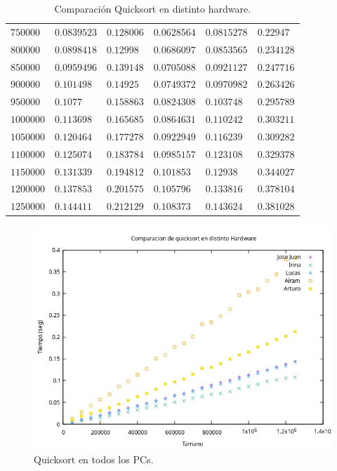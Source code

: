 \documentclass[12pt]{article}
\begin{document}
\begin{table}
\begin{tabular}{|l|l|l|l|l|l|}
            $750000$ & $0.0839523$ & $0.128006$ & $0.0628564$ & $0.0815278$ & $0.22947$ \\
            $800000$ & $0.0898418$ & $0.12998$ & $0.0686097$ & $0.0853565$ & $0.234128$ \\
            $850000$ & $0.0959496$ & $0.139148$ & $0.0705088$ & $0.0921127$ & $0.247716$ \\
            $900000$ & $0.101498$ & $0.14925$ & $0.0749372$ & $0.0970982$ & $0.263426$ \\
            $950000$ & $0.1077$ & $0.158863$ & $0.0824308$ & $0.103748$ & $0.295789$ \\
            $1000000$ & $0.113698$ & $0.165685$ & $0.0864631$ & $0.110242$ & $0.303211$ \\
            $1050000$ & $0.120464$ & $0.177278$ & $0.0922949$ & $0.116239$ & $0.309282$ \\
            $1100000$ & $0.125074$ & $0.183784$ & $0.0985157$ & $0.123108$ & $0.329378$ \\
            $1150000$ & $0.131339$ & $0.194812$ & $0.101853$ & $0.12938$ & $0.344027$ \\
            $1200000$ & $0.137853$ & $0.201575$ & $0.105796$ & $0.133816$ & $0.378104$ \\
            $1250000$ & $0.144411$ & $0.212129$ & $0.108373$ & $0.143624$ & $0.381028$ \\
            \hline
        \end{tabular}
        \caption{Comparación Quicksort en distinto hardware.}
        \label{tab:comp_hardware_quicksort}
    \end{table}
    \begin{figure}
        \centering
        \includegraphics[width=0.8\linewidth]{images/Comparaciones_hardware/Comparacion_hardware_quicksort.png}
        \caption{Quicksort en todos los PCs.}
        \label{fig:CompHardwareQuicksort}
    \end{figure}
\end{document}

